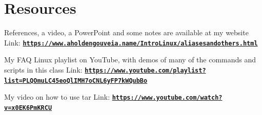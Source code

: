 \documentclass[12pt]{article}
\begin{document}
\section*{Resources}
References, a video, a PowerPoint and some notes are available at my website
Link: \href{https://www.aholdengouveia.name/IntroLinux/aliasesandothers.html}{\textbf{\nolinkurl{https://www.aholdengouveia.name/IntroLinux/aliasesandothers.html}}}

My FAQ Linux playlist on YouTube, with demos of many of the commands and scripts in this class
Link: \href{https://www.youtube.com/playlist?list=PLQOmuLC45eoQlIMH7oCNL6yFP7kWQubBo}{\textbf{\nolinkurl{https://www.youtube.com/playlist?list=PLQOmuLC45eoQlIMH7oCNL6yFP7kWQubBo}}}

My video on how to use tar
Link: \href{https://www.youtube.com/watch?v=x0EK6PmKRCU}{\textbf{\nolinkurl{https://www.youtube.com/watch?v=x0EK6PmKRCU}}}
\end{document}
